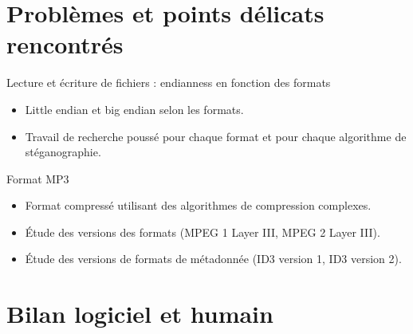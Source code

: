 \documentclass{beamer}
\begin{document}
  
  \section{Problèmes et points délicats rencontrés} 
  
  \begin{frame}
  
	\begin{block}{Lecture et écriture de fichiers : endianness en fonction des formats}
	\begin{itemize}
	[circle]

	\item Little endian et big endian selon les formats. 
	\item Travail de recherche poussé pour chaque format et pour chaque 
	algorithme de stéganographie.
	\end{itemize}
	\end{block}
		
	\begin{block}{Format MP3}
	\begin{itemize}
	[circle]
	\item Format compressé utilisant des algorithmes de compression complexes.
	\item Étude des versions des formats (MPEG 1 Layer III, MPEG 2 Layer III). 
	\item Étude des versions de formats de métadonnée (ID3 version 1, ID3 version 2). 
	\end{itemize}
	\end{block}
	
	\end{frame}
  
  \section{Bilan logiciel et humain}
  
\end{document}
